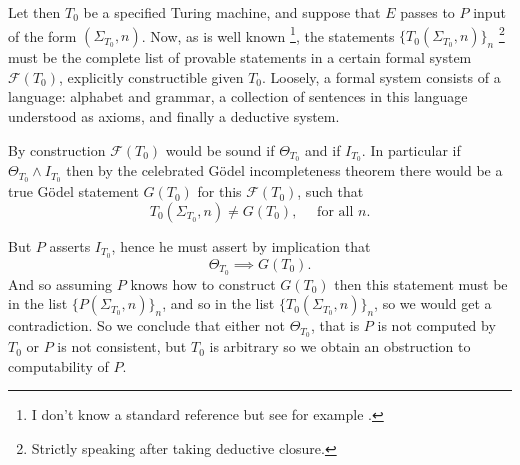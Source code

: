\documentclass{amsart}  %
\numberwithin{equation}{section}
\theoremstyle{definition}
\theoremstyle{remark}
\begin{document}
{Let then $T _{0} $ be a specified Turing machine, and suppose that $E$ passes to $P$ input of the form $(\Sigma _{T _{0} }, n)$.  %
 Now, as is well known \footnote {I don't know a standard reference but see  for example \cite{citeFeferman2006-SFEATA}.}, the statements $\{T _{0} (\Sigma _{T _{0} },n)\} _{n}  $ \footnote {Strictly speaking after taking deductive closure.} must be the complete list of provable statements in a certain formal system $\mathcal{F} (T _{0} )$, explicitly constructible given $T _{0} $. 
Loosely, a formal system consists of a language: alphabet and grammar, a collection of sentences in this language understood as axioms,   and finally a deductive system.  

By construction $\mathcal{F} (T _{0} )$ would be sound if $\Theta _{T _{0} } $ and if $I _{T _{0} } $. In particular if $\Theta _{T _{0}} \land I _{T _{0} } $ then by the celebrated G\"odel incompleteness theorem there would be a true  G\"odel statement $G (T _{0})$ for this $\mathcal{F} (T _{0} )$,  such that $$T _{0} (\Sigma _{T _{0} }, n ) \neq G(T _{0}), \quad \text{ for all $n$.}$$     

But $P$ asserts $I _{T _{0} } $, hence he must assert by implication that $$ \Theta_{T_{0}} \implies G(T_{0}).$$ And so assuming $P$ knows how to construct $G (T _{0} )$ then this statement must be in the list $\{P (\Sigma _{T _{0} },n)\} _{n}  $, and so in the list $\{T _{0}  (\Sigma _{T _{0} },n)\} _{n}  $,  so we would get a contradiction. 
So we conclude that either not $\Theta _{T _{0} } $, that is $P$ is not computed by $T _{0} $ or $P$ is not consistent, but $T _{0} $ is arbitrary so we obtain an obstruction to computability of $P$.  
  

}
\end{document}
